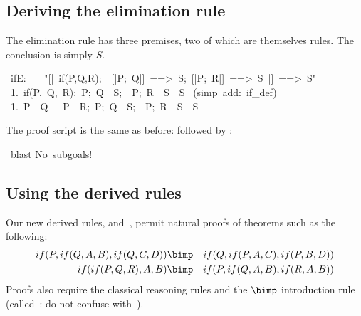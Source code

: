 \subsection{Deriving the elimination rule}
The elimination rule has three premises, two of which are themselves rules.
The conclusion is simply $S$.
\begin{isabelle}
\ ifE:\isanewline
\ \ \ "[|\ if(P,Q,R);\ \ [|P;\ Q|]\ ==>\ S;\ [|\isachartilde P;\ R|]\ ==>\ S\ |]\ ==>\ S"\isanewline
\ 1.\ \isasymlbrakk if(P,\ Q,\ R);\ \isasymlbrakk P;\ Q\isasymrbrakk \ \isasymLongrightarrow \ S;\ \isasymlbrakk \isasymnot \ P;\ R\isasymrbrakk \ \isasymLongrightarrow \ S\isasymrbrakk \ \isasymLongrightarrow \ S%
\isanewline
{}\ (simp\ add:\ if\_def)\isanewline
\ 1.\ \isasymlbrakk P\ \isasymand \ Q\ \isasymor \ \isasymnot \ P\ \isasymand \ R;\ \isasymlbrakk P;\ Q\isasymrbrakk \ \isasymLongrightarrow \ S;\ \isasymlbrakk \isasymnot \ P;\ R\isasymrbrakk \ \isasymLongrightarrow \ S\isasymrbrakk \ \isasymLongrightarrow \ S%
\end{isabelle}
The proof script is the same as before:  followed by
:
\begin{isabelle}
\ blast\isanewline
No\ subgoals!\isanewline
{}
\end{isabelle}


\subsection{Using the derived rules}
Our new derived rules,  and~, permit natural
proofs of theorems such as the following:
\begin{eqnarray*}
    if(P, if(Q,A,B), if(Q,C,D)) & \bimp & if(Q,if(P,A,C),if(P,B,D)) \\
    if(if(P,Q,R), A, B)         & \bimp & if(P,if(Q,A,B),if(R,A,B))
\end{eqnarray*}
Proofs also require the classical reasoning rules and the $\bimp$
introduction rule (called~: do not confuse with~). 

